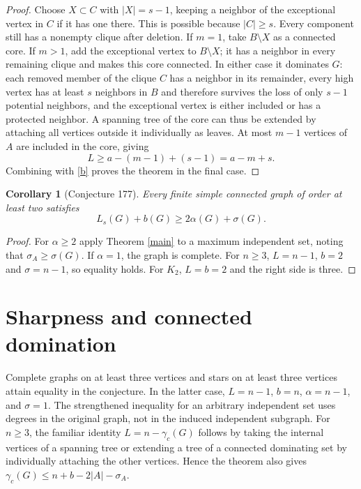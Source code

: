 \documentclass[11pt,a4paper]{article}
\newtheorem{corollary}[theorem]{Corollary}
\begin{document}
\begin{proof}
Choose $X\subset C$ with $|X|=s-1$, keeping a neighbor of the exceptional vertex in $C$ if it has one there. This is possible because $|C|\ge s$. Every component still has a nonempty clique after deletion. If $m=1$, take $B\setminus X$ as a connected core. If $m>1$, add the exceptional vertex to $B\setminus X$; it has a neighbor in every remaining clique and makes this core connected. In either case it dominates $G$: each removed member of the clique $C$ has a neighbor in its remainder, every high vertex has at least $s$ neighbors in $B$ and therefore survives the loss of only $s-1$ potential neighbors, and the exceptional vertex is either included or has a protected neighbor. A spanning tree of the core can thus be extended by attaching all vertices outside it individually as leaves. At most $m-1$ vertices of $A$ are included in the core, giving
\[
 L\ge a-(m-1)+(s-1)=a-m+s.
\]
Combining with \eqref{b} proves the theorem in the final case.
\end{proof}
\begin{corollary}[Conjecture 177]
Every finite simple connected graph of order at least two satisfies
\[
 L_s(G)+b(G)\ge 2\alpha(G)+\sigma(G).
\]
\end{corollary}
\begin{proof}
For $\alpha\ge2$ apply Theorem \ref{main} to a maximum independent set, noting that $\sigma_A\ge\sigma(G)$. If $\alpha=1$, the graph is complete. For $n\ge3$, $L=n-1$, $b=2$ and $\sigma=n-1$, so equality holds. For $K_2$, $L=b=2$ and the right side is three.
\end{proof}
\section{Sharpness and connected domination}
Complete graphs on at least three vertices and stars on at least three vertices attain equality in the conjecture. In the latter case, $L=n-1$, $b=n$, $\alpha=n-1$, and $\sigma=1$. The strengthened inequality for an arbitrary independent set uses degrees in the original graph, not in the induced independent subgraph. For $n\ge3$, the familiar identity $L=n-\gamma_c(G)$ follows by taking the internal vertices of a spanning tree or extending a tree of a connected dominating set by individually attaching the other vertices. Hence the theorem also gives $\gamma_c(G)\le n+b-2|A|-\sigma_A$.
\end{document}
